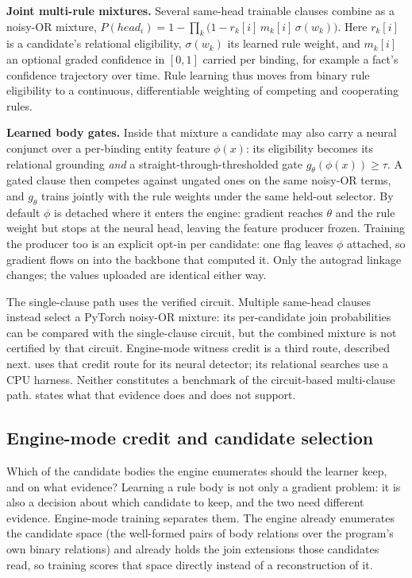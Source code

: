 \textbf{Joint multi-rule mixtures.} Several same-head trainable clauses combine as a noisy-OR mixture, $P(\mathit{head}_i)=1-\prod_k\bigl(1-r_k[i]\,m_k[i]\,\sigma(w_k)\bigr)$. Here $r_k[i]$ is a candidate's relational eligibility, $\sigma(w_k)$ its learned rule weight, and $m_k[i]$ an optional graded confidence in $[0,1]$ carried per binding, for example a fact's confidence trajectory over time. Rule learning thus moves from binary rule eligibility to a continuous, differentiable weighting of competing and cooperating rules.

\textbf{Learned body gates.} Inside that mixture a candidate may also carry a neural conjunct over a per-binding entity feature $\phi(x)$: its eligibility becomes its relational grounding \emph{and} a straight-through-thresholded gate $g_\theta(\phi(x))\ge\tau$. A gated clause then competes against ungated ones on the same noisy-OR terms, and $g_\theta$ trains jointly with the rule weights under the same held-out selector. By default $\phi$ is detached where it enters the engine: gradient reaches $\theta$ and the rule weight but stops at the neural head, leaving the feature producer frozen. Training the producer too is an explicit opt-in per candidate: one flag leaves $\phi$ attached, so gradient flows on into the backbone that computed it. Only the autograd linkage changes; the values uploaded are identical either way.

The single-clause path uses the verified circuit. Multiple same-head clauses instead select a PyTorch noisy-OR mixture: its per-candidate join probabilities can be compared with the single-clause circuit, but the combined mixture is not certified by that circuit. Engine-mode witness credit is a third route, described next.  uses that credit route for its neural detector; its relational searches use a CPU harness. Neither constitutes a benchmark of the circuit-based multi-clause path.  states what that evidence does and does not support.

\subsection{Engine-mode credit and candidate selection}\label{subsec:engine-mode}

Which of the candidate bodies the engine enumerates should the learner keep, and on what evidence? Learning a rule body is not only a gradient problem: it is also a decision about which candidate to keep, and the two need different evidence. Engine-mode training separates them. The engine already enumerates the candidate space (the well-formed pairs of body relations over the program's own binary relations) and already holds the join extensions those candidates read, so training scores that space directly instead of a reconstruction of it.

